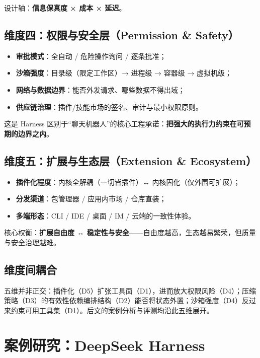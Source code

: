 \documentclass[11pt,a4paper]{ctexart}
\begin{document}
设计轴：\textbf{信息保真度 × 成本 × 延迟}。

\subsection{维度四：权限与安全层（Permission \& Safety）}

\begin{itemize}
  \item \textbf{审批模式}：全自动 / 危险操作询问 / 逐条批准；
  \item \textbf{沙箱强度}：目录级（限定工作区）→ 进程级 → 容器级 → 虚拟机级；
  \item \textbf{网络与数据边界}：能否外发请求、哪些数据不得出域；
  \item \textbf{供应链治理}：插件/技能市场的签名、审计与最小权限原则。
\end{itemize}

这是 Harness 区别于“聊天机器人”的核心工程承诺：\textbf{把强大的执行力约束在可预期的边界之内}。

\subsection{维度五：扩展与生态层（Extension \& Ecosystem）}

\begin{itemize}
  \item \textbf{插件化程度}：内核全解耦（一切皆插件）↔ 内核固化（仅外围可扩展）；
  \item \textbf{分发渠道}：包管理器 / 应用内市场 / 仓库直装；
  \item \textbf{多端形态}：CLI / IDE / 桌面 / IM / 云端的一致性体验。
\end{itemize}

核心权衡：\textbf{扩展自由度 ↔ 稳定性与安全}——自由度越高，生态越易繁荣，但质量与安全治理越难。

\subsection{维度间耦合}

五维并非正交：插件化（D5）扩张工具面（D1），进而放大权限风险（D4）；压缩策略（D3）的有效性依赖编排结构（D2）能否将状态外置；沙箱强度（D4）反过来约束可用工具集（D1）。后文的案例分析与评测均沿此五维展开。

\section{案例研究：DeepSeek Harness}
\end{document}
